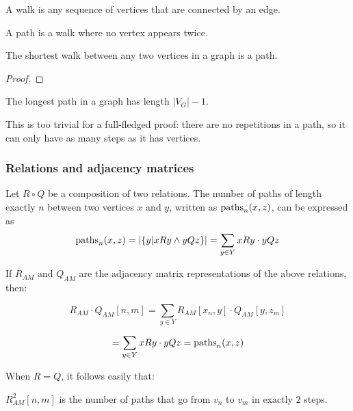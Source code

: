 \begin{definition}
    A walk is any sequence of vertices that are connected by an edge.
\end{definition}

\begin{definition}
    A path is a walk where no vertex appears twice.
\end{definition}

\begin{theorem}
    The shortest walk between any two vertices in a graph is a path.
\end{theorem}

\begin{proof}
\end{proof}

\begin{theorem}
    The longest path in a graph has length $ | V_G | - 1 $.
\end{theorem}
This is too trivial for a full-fledged proof: there are no repetitions in a path, so it can only have as many steps as it has vertices.


\subsubsection{Relations and adjacency matrices}

Let $R \circ Q$ be a composition of two relations. The number of paths of length exactly $n$ between two vertices $x$ and $y$, written as $\operatorname{paths}_n(x, z)$, can be expressed  as 
 $$ \operatorname{paths}_n(x,z) = | \{ y | xRy \land yQz \} | = \sum_{y \in Y} xRy \cdot yQz$$


If $R_{AM}$ and $Q_{AM}$ are the adjacency matrix representations of the above relations, then: 

$$  R_{AM} \cdot Q_{AM} [n,m] = \sum_{y \in Y} R_{AM} [x_n, y] \cdot Q_{AM} [y, z_m] $$

$$ = \sum_{y \in Y} xRy \cdot yQz = \operatorname{paths}_n(x,z) $$

When $R=Q$, it follows easily that:

\begin{theorem}
    $R_{AM}^2 [n,m]$ is the number of paths  that go from $v_n$ to $v_m$ in exactly $2$ steps.
\end{theorem}


